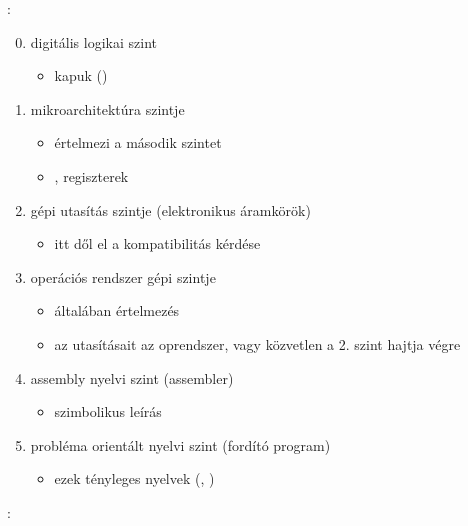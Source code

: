 \documentclass[main.tex]{subfiles}
\begin{document}
  \vspace{1em}
  {\large {}:}
  \begin{enumerate}
    \setcounter{enumi}{-1} 
    \item digitális logikai szint
    \begin{itemize}
      \item kapuk ()
    \end{itemize}
    
    \item mikroarchitektúra  szintje
    \begin{itemize}
      \item értelmezi a második szintet
      \item {}, regiszterek
    \end{itemize}
    
    \item gépi utasítás szintje (elektronikus áramkörök)
    \begin{itemize}
      \item itt dől el a kompatibilitás kérdése
    \end{itemize}
    
    \item operációs rendszer gépi szintje
    \begin{itemize}
      \item általában értelmezés
      \item az utasításait az oprendszer,
      vagy közvetlen a 2. szint hajtja végre
    \end{itemize}
    
    \item assembly nyelvi szint (assembler)
    \begin{itemize}
      \item szimbolikus leírás
    \end{itemize}
    
    \item probléma orientált nyelvi szint (fordító program)
    \begin{itemize}
      \item ezek tényleges nyelvek (, )
    \end{itemize}
  \end{enumerate}

  {\large {}:}
  \vspace{1em}
\end{document}
